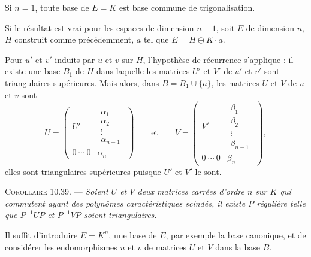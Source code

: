 Si $n=1$, toute base de $E=K$ est base commune de trigonalisation.

Si le résultat est vrai pour les espaces de dimension $n-1$, soit $E$ de dimension $n$, $H$ construit comme précédemment, $a$ tel que $E=H\oplus K\cdot a$.

Pour $u'$ et $v'$ induits par $u$ et $v$ sur $H$, l'hypothèse de récurrence s'applique : il existe une base $B_1$ de $H$ dans laquelle les matrices $U'$ et $V'$ de $u'$ et $v'$ sont triangulaires supérieures. Mais alors, dans $B=B_1\cup\{a\}$, les matrices $U$ et $V$ de $u$ et $v$ sont
\[
U=\begin{pmatrix}U'&\begin{matrix}\alpha_1\\\alpha_2\\\vdots\\\alpha_{n-1}\end{matrix}\\0\ \cdots\ 0&\alpha_n\end{pmatrix}
\qquad\text{et}\qquad
V=\begin{pmatrix}V'&\begin{matrix}\beta_1\\\beta_2\\\vdots\\\beta_{n-1}\end{matrix}\\0\ \cdots\ 0&\beta_n\end{pmatrix},
\]
elles sont triangulaires supérieures puisque $U'$ et $V'$ le sont. \bookend

\medskip\noindent\textsc{Corollaire 10.39.} --- \emph{Soient $U$ et $V$ deux matrices carrées d'ordre $n$ sur $K$ qui commutent ayant des polynômes caractéristiques scindés, il existe $P$ régulière telle que $P^{-1}UP$ et $P^{-1}VP$ soient triangulaires.}

Il suffit d'introduire $E=K^n$, une base de $E$, par exemple la base canonique, et de considérer les endomorphismes $u$ et $v$ de matrices $U$ et $V$ dans la base $B$. \bookend
